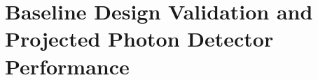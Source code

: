 \section{Baseline Design Validation and Projected Photon Detector Performance}
\label{sec:fddp-pds-performance}



